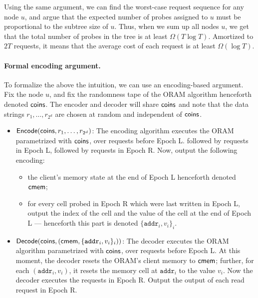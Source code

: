 Using the same argument, we can find the worst-case
request sequence for any node $u$, and argue
that the expected number  
of probes assigned to $u$ 
must be proportional to the subtree size of $u$.
Thus, when we sum up all nodes $u$, we get
that the total number of probes in the tree is 
at least $\Omega(T  \log T)$.
Amortized to $2T$ requests, it means that 
the average 
cost of each request 
is at least $\Omega(\log T)$.

\paragraph{Formal encoding argument.}
To formalize the above the intuition, we can use an encoding-based argument.
Fix the node $u$, 
and fix the randomness tape
of the ORAM algorithm henceforth denoted ${\sf coins}$.
The encoder and decoder will share ${\sf coins}$
and note that 
the data strings $r_1, \ldots, r_{2^d}$ are chosen at random 
and independent of ${\sf coins}$.


\begin{itemize}[leftmargin=6mm]
\item  ${\sf Encode}({\sf coins}, r_1, \ldots, r_{2^d})$:
The encoding algorithm executes the ORAM parametrized
with ${\sf coins}$, over requests before Epoch L.
followed by requests in Epoch L, 
followed by requests in Epoch R.
Now, output the following encoding:
\begin{itemize}
\item 
the client's memory state at the end of Epoch L henceforth denoted
${\sf cmem}$; 
\item 
for every cell probed 
in Epoch R which were 
last written in Epoch L, output
the index of the cell and 
the value of the cell at the end of Epoch L --- henceforth
this part is denoted $\{\texttt{addr}_i, v_i\}_i$.
\end{itemize}


\item  ${\sf Decode}({\sf coins}, ({\sf cmem}, \{\texttt{addr}_i, v_i\}_i))$:
The decoder executes the ORAM algorithm 
parametrized with ${\sf coins}$, over requests before Epoch L.
At this moment, 
the decoder resets the ORAM's client memory to ${\sf cmem}$;  
further, 
for each $(\texttt{addr}_i, v_i)$, it resets
the memory cell at $\texttt{addr}_i$ to the value $v_i$.
Now the decoder executes the requests in Epoch R.
Output the output of each read request in
Epoch R.
\end{itemize}

